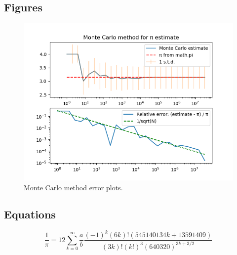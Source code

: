\documentclass[11pt]{article}
\begin{document}
\subsection*{Figures}
\begin{figure}[h!]
    \centering
    \includegraphics[width=\textwidth]{monte_carlo_plot.png}
    \caption{Monte Carlo method error plots.}
    \label{fig:monte_carlo_plot}
\end{figure}
\subsection*{Equations}
\begin{equation}
    \label{eq:chudnovsky}
    \frac{1}{\pi} =  12\sum_{k=0}^{\infty}\frac{a}{b} \frac{(-1)^k(6k)!(545140134k+13591409)}{(3k)!(k!)^3(640320)^{3k+3/2}}
\end{equation}
\end{document}
